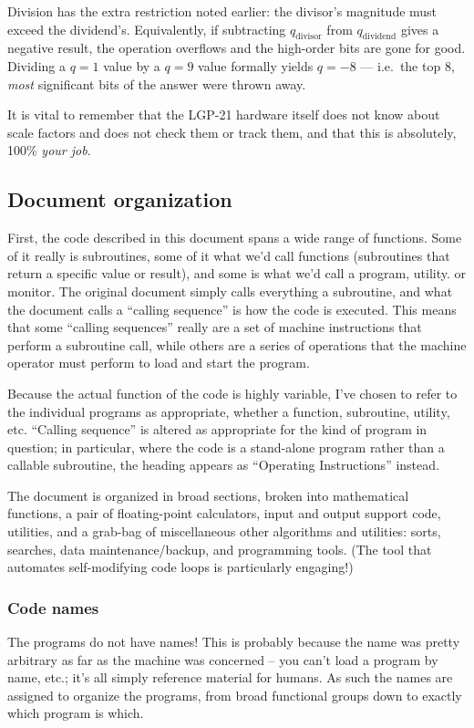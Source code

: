 Division has the extra restriction noted earlier: the divisor's magnitude must exceed the dividend's. Equivalently, if subtracting $q_\text{divisor}$ from $q_\text{dividend}$ gives a negative result, the operation overflows and the high-order bits are gone for good. Dividing a $q=1$ value by a $q=9$ value formally yields $q=-8$ --- i.e.\ the top 8, \emph{most} significant bits of the answer were thrown away.
 
It is vital to remember that the LGP-21 hardware itself does not know about scale factors and does not check them or track them, and that this is absolutely, 100\% \emph{your job}.

\subsection{Document organization}
First, the code described in this document spans a wide range of functions. Some of it really is subroutines, some of it what we'd call functions (subroutines that return a specific value or result), and some is what we'd
call a program, utility. or monitor. The original document simply calls everything a subroutine, and what the document calls a ``calling sequence'' is how the code is executed. This means that some ``calling sequences'' really are a set of machine instructions that perform a subroutine call, while others are a series of operations that the machine operator must perform to load and start the program.

Because the actual function of the code is highly variable, I've chosen to refer to the individual programs as appropriate, whether a function, subroutine, utility, etc. ``Calling sequence'' is altered as appropriate for the kind of program in question; in particular, where the code is a stand-alone program rather than a callable subroutine, the heading appears as ``Operating Instructions'' instead.

The document is organized in broad sections, broken into mathematical functions, a pair of floating-point calculators, input and output support code, utilities, and a grab-bag of miscellaneous other algorithms and utilities: sorts, searches, data maintenance/backup, and programming tools. (The tool that automates self-modifying code loops is particularly engaging!)

\subsubsection*{Code names}
The programs do not have names! This is probably because the name was pretty arbitrary as far as the machine was concerned -- you can't load a program by name, etc.; it's all simply reference material for humans.
As such the names are assigned to organize the programs, from broad functional groups down to exactly which program is which.

